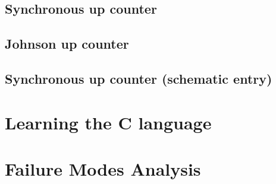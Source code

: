 \documentclass{article}
\begin{document}


\subsection{Synchronous up counter}



\subsection{Johnson up counter}



\subsection{Synchronous up counter (schematic entry)}

\section{Learning the C language}



\section{Failure Modes Analysis}
\end{document}
